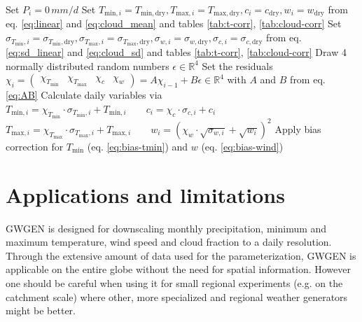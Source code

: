 \begin{refsection}
\begin{algorithm}
\begin{algorithmic}[1]
		\ELSE
		\STATE Set $P_i = 0\,\unit{mm/d}$
		\STATE Set $T_{\mathrm{min}, i} = T_{\mathrm{min}, \mathrm{dry}}, T_{\mathrm{max}, i} = T_{\mathrm{max}, \mathrm{dry}}, c_i = c_\mathrm{dry}, w_i = w_\mathrm{dry}$ from eq. \eqref{eq:linear} and \eqref{eq:cloud_mean} and tables \ref{tab:t-corr}, \ref{tab:cloud-corr}
		\label{a:gwgen:adjust_dry}
		\STATE Set $
		\sigma_{T_\mathrm{min},i} = \sigma_{T_\mathrm{min},\mathrm{dry}}, \sigma_{T_\mathrm{max},i} = \sigma_{T_\mathrm{max},\mathrm{dry}}, \sigma_{w,i} = \sigma_{w,\mathrm{dry}}, \sigma_{c,i} = \sigma_{c,\mathrm{dry}}$ from eq. \eqref{eq:sd_linear} and \eqref{eq:cloud_sd} and tables \ref{tab:t-corr}, \ref{tab:cloud-corr}
		\ENDIF
		\STATE Draw 4 normally distributed random numbers $\epsilon\in\mathbb{R}^4$  \label{a:gwgen:cross}
		\STATE Set the residuals 
		$\chi_i = 
		\begin{pmatrix} 
		\chi_{T_\mathrm{min}} & \chi_{T_\mathrm{max}} & \chi_c & \chi_w
		\end{pmatrix} = A\chi_{i-1} + B\epsilon \in \mathbb{R}^4$ with $A$ and $B$ from eq. \eqref{eq:AB}
		\STATE Calculate daily variables via \\
		$T_{\mathrm{min},i} = \chi_{T_\mathrm{min}} \cdot \sigma_{T_\mathrm{min},i} + T_{\mathrm{min}, i} \qquad c_{i} = \chi_{c} \cdot \sigma_{c,i} + c_{i}$ \\
		$T_{\mathrm{max},i} = \chi_{T_\mathrm{max}} \cdot \sigma_{T_\mathrm{max},i} + T_{\mathrm{max}, i} \qquad w_{i} = \left(\chi_{w} \cdot \sqrt{\sigma_{w,i}} + \sqrt{w_{i}}\right)^2$ \label{a:gwgen:cross-end}
		\STATE Apply bias correction for $T_\mathrm{min}$ (eq. \eqref{eq:bias-tmin}) and $w$ (eq. \eqref{eq:bias-wind}) 
		\ENDFOR
		\ENDWHILE
		\ENDFOR
	\end{algorithmic}
\end{algorithm}


\section{Applications and limitations}
GWGEN is designed for downscaling monthly precipitation, minimum and maximum temperature, wind speed and cloud fraction to a daily resolution. Through the extensive amount of data used for the parameterization, GWGEN is applicable on the entire globe without the need for spatial information. However one should be careful when using it for small regional experiments (e.g. on the catchment scale) where other, more specialized and regional weather generators might be better.


\end{refsection}
